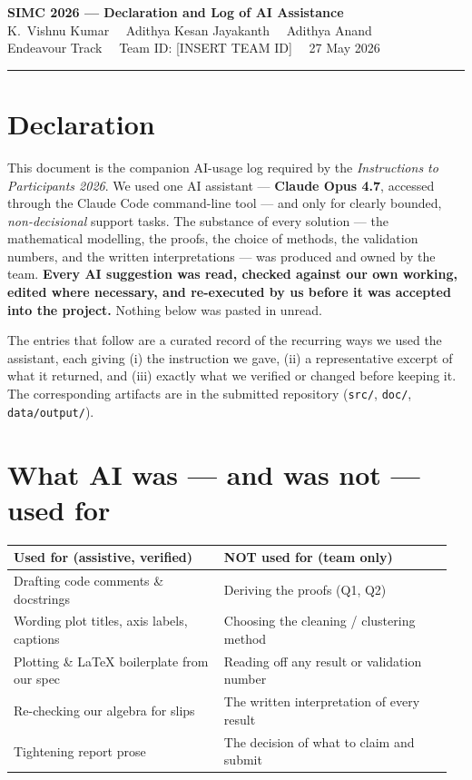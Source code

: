 \documentclass[11pt,a4paper]{article}
\begin{document}
\begin{center}
{\Large\bfseries SIMC 2026 --- Declaration and Log of AI Assistance}\\[2pt]
{\normalsize K.\ Vishnu Kumar \ \textperiodcentered\ Adithya Kesan Jayakanth \ \textperiodcentered\ Adithya Anand}\\[1pt]
{\small Endeavour Track \ \textperiodcentered\ Team ID: [INSERT TEAM ID] \ \textperiodcentered\ 27 May 2026}
\end{center}
\rule{\linewidth}{0.4pt}

\section{Declaration}
This document is the companion AI-usage log required by the \emph{Instructions to Participants
2026}. We used one AI assistant --- \textbf{Claude Opus 4.7}, accessed through the Claude Code
command-line tool --- and only for clearly bounded, \emph{non-decisional} support tasks. The
substance of every solution --- the mathematical modelling, the proofs, the choice of methods,
the validation numbers, and the written interpretations --- was produced and owned by the team.
\textbf{Every AI suggestion was read, checked against our own working, edited where necessary,
and re-executed by us before it was accepted into the project.} Nothing below was pasted in
unread.

The entries that follow are a curated record of the recurring ways we used the assistant, each
giving (i) the instruction we gave, (ii) a representative excerpt of what it returned, and (iii)
exactly what we verified or changed before keeping it. The corresponding artifacts are in the
submitted repository (\texttt{src/}, \texttt{doc/}, \texttt{data/output/}).

\section{What AI was --- and was not --- used for}
\begin{center}\small
\begin{tabular}{@{}p{0.46\linewidth}p{0.50\linewidth}@{}}
\hline
\textbf{Used for (assistive, verified)} & \textbf{NOT used for (team only)} \\
\hline
Drafting code comments \& docstrings & Deriving the proofs (Q1, Q2) \\
Wording plot titles, axis labels, captions & Choosing the cleaning / clustering method \\
Plotting \& \LaTeX{} boilerplate from our spec & Reading off any result or validation number \\
Re-checking our algebra for slips & The written interpretation of every result \\
Tightening report prose & The decision of what to claim and submit \\
\hline
\end{tabular}
\end{center}
\end{document}
